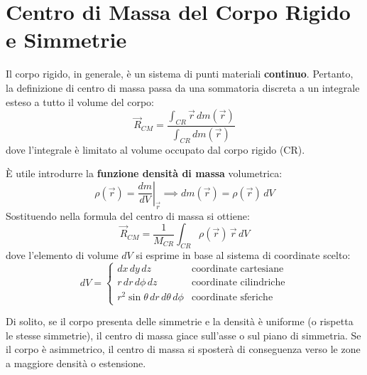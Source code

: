 \section{Centro di Massa del Corpo Rigido e Simmetrie}
Il corpo rigido, in generale, è un sistema di punti materiali \textbf{continuo}. Pertanto, la definizione di centro di massa passa da una sommatoria discreta a un integrale esteso a tutto il volume del corpo:
\begin{equation}
    \vec{R}_{CM} = \frac{\int_{CR} \vec{r} \, dm(\vec{r})}{\int_{CR} dm(\vec{r})}
\end{equation}
dove l'integrale è limitato al volume occupato dal corpo rigido (CR).

È utile introdurre la \textbf{funzione densità di massa} volumetrica:
\begin{equation}
    \rho(\vec{r}) = \left. \frac{dm}{dV} \right|_{\vec{r}} \implies dm(\vec{r}) = \rho(\vec{r}) \, dV
\end{equation}
Sostituendo nella formula del centro di massa si ottiene:
\begin{equation}
    \vec{R}_{CM} = \frac{1}{M_{CR}} \int_{CR} \rho(\vec{r}) \, \vec{r} \, dV
\end{equation}
dove l'elemento di volume $dV$ si esprime in base al sistema di coordinate scelto:
\begin{equation*}
dV = 
\begin{cases} 
dx \, dy \, dz & \text{coordinate cartesiane} \\ 
r \, dr \, d\phi \, dz & \text{coordinate cilindriche} \\ 
r^2 \sin\theta \, dr \, d\theta \, d\phi & \text{coordinate sferiche} 
\end{cases}
\end{equation*}

Di solito, se il corpo presenta delle simmetrie e la densità è uniforme (o rispetta le stesse simmetrie), il centro di massa giace sull'asse o sul piano di simmetria. Se il corpo è asimmetrico, il centro di massa si sposterà di conseguenza verso le zone a maggiore densità o estensione.

